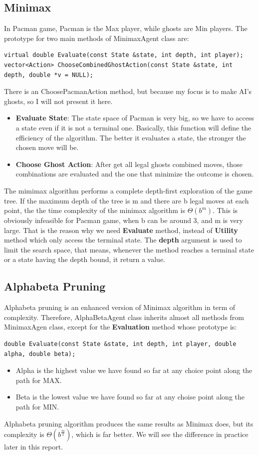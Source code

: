 \documentclass[a4paper, 11pt]{article}
\begin{document}
\subsection{Minimax}
In Pacman game, Pacman is the Max player, while ghosts are Min players. The prototype for two main methods of MinimaxAgent class are: 
\begin{lstlisting}
virtual double Evaluate(const State &state, int depth, int player);
vector<Action> ChooseCombinedGhostAction(const State &state, int depth, double *v = NULL);
\end{lstlisting}
There is an ChoosePacmanAction method, but because my focus is to make AI's ghosts, so I will not present it here.
\begin{itemize}
\item \textbf{Evaluate State}: The state space of Pacman is very big, so we have to access a state even if it is not a terminal one. Basically, this function will define the efficiency of the algorithm. The better it evaluates a state, the stronger the chosen move will be.
\item \textbf{Choose Ghost Action}: After get all legal ghosts combined moves, those combinations are evaluated and the one that minimize the outcome is chosen. 
\end{itemize}
The mimimax algorithm performs a complete depth-first exploration of the game tree. If the maximum depth of the tree is m and there are b legal moves at each point, the the time complexity of the minimax algorithm is $\Theta (b^m)$. This is obviously infeasible for Pacman game, when b can be around 3, and m is very large. That is the reason why we need \textbf{Evaluate} method, instead of \textbf{Utility} method which only access the terminal state. The \textbf{depth} argument is used to limit the search space, that means, whenever the method reaches a terminal state or a state having the depth bound, it return a value.
\subsection{Alphabeta Pruning}
Alphabeta pruning is an enhanced version of Minimax algorithm in term of complexity. Therefore, AlphaBetaAgent class inherits almost all methods from MinimaxAgen class, except for the \textbf{Evaluation} method whose prototype is:
\begin{lstlisting}
double Evaluate(const State &state, int depth, int player, double alpha, double beta);
\end{lstlisting}
\begin{itemize}
\item Alpha is the highest value  we have found so far at any choice point along the path for MAX.
\item Beta is the lowest value we have found so far at any choise point along the path for MIN.
\end{itemize}
Alphabeta pruning algorithm produces the same results as Minimax does, but its complexity is $\Theta (b^{\frac{m}{2}})$, which is far better. We will see the difference in practice later in this report.
\end{document}
